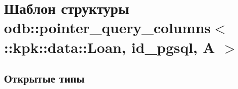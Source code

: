 \hypertarget{structodb_1_1pointer__query__columns_3_01_1_1kpk_1_1data_1_1_loan_00_01id__pgsql_00_01_a_01_4}{}\section{Шаблон структуры odb\+:\+:pointer\+\_\+query\+\_\+columns$<$ \+:\+:kpk\+:\+:data\+:\+:Loan, id\+\_\+pgsql, A $>$}
\label{structodb_1_1pointer__query__columns_3_01_1_1kpk_1_1data_1_1_loan_00_01id__pgsql_00_01_a_01_4}
\subsection*{Открытые типы}
